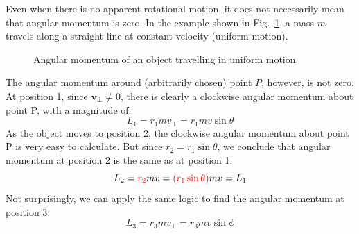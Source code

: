 Even when there is no apparent rotational motion, it does not necessarily mean
that angular momentum is zero. In the example shown in
Fig.~\ref{fig:straight-line-angular-momentum}, a mass $m$ travels along a
straight line at constant velocity (uniform motion).
\begin{figure}[ht]
  \centering
  \caption{Angular momentum of an object travelling in uniform motion}
  \label{fig:straight-line-angular-momentum}
\end{figure}
The angular momentum around (arbitrarily chosen) point $P$, however, is not
zero. At position 1, since $\bm v_\perp\neq 0$, there is clearly a clockwise
angular momentum about point P, with a magnitude of:
\begin{equation*}
  L_1=r_1mv_\perp=r_1mv\sin\theta
\end{equation*}
As the object moves to position 2, the clockwise angular momentum about point P
is very easy to calculate. But since $r_2=r_1\sin\theta$, we conclude that
angular momentum at position 2 is the same as at position 1:
\begin{equation*}
  L_2={\color{red}r_2}mv={\color{red}(r_1\sin\theta)}mv=L_1
\end{equation*}
Not surprisingly, we can apply the same logic to find the angular momentum at
position 3:
\begin{equation*}
  L_3=r_3mv_\perp=r_3mv\sin\phi
\end{equation*}
